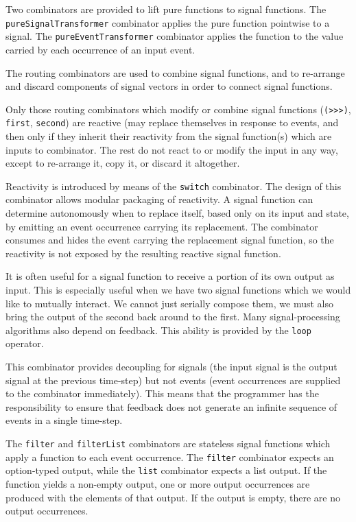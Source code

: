 Two combinators are provided to lift pure functions to signal functions.
The {\tt pureSignalTransformer} combinator applies the pure function pointwise
to a signal. The {\tt pureEventTransformer} combinator applies the function to
the value carried by each occurrence of an input event.

The routing combinators are used to combine signal functions, and to re-arrange
and discard components of signal vectors in order to connect signal functions.

Only those routing combinators which modify or combine signal functions
({\tt (>>>)}, {\tt first}, {\tt second}) are reactive (may replace themselves in
response to events, and then only if they inherit their reactivity from the
signal function(s) which are inputs to combinator. The rest do not
react to or modify the input in any way, except to re-arrange it, copy it, or
discard it altogether.

Reactivity is introduced by means of the {\tt switch} combinator.
The design of this combinator
allows modular packaging of reactivity. A signal function can determine
autonomously when to replace itself, based only on its input and state,
by emitting an event occurrence carrying its replacement. The combinator
consumes and hides the event carrying the replacement signal function, 
so the reactivity is not exposed by the resulting reactive signal function.

It is often useful for a signal function to receive a portion of its
own output as input. This is especially useful when we have two
signal functions which we would like to mutually interact. We cannot
just serially compose them, we must also bring the output of the second
back around to the first. Many signal-processing algorithms also depend
on feedback. This ability is provided by the {\tt loop} operator. 

This combinator provides decoupling for signals
(the input signal is the output signal at the previous time-step)
but not events (event occurrences are supplied to the combinator immediately).
This means that the programmer has the responsibility to ensure that feedback
does not generate an infinite sequence of events in a single time-step.

The {\tt filter} and {\tt filterList} combinators are stateless signal functions
which apply a function to each event occurrence. The {\tt filter} combinator
expects an option-typed output, while the {\tt list} combinator expects a list
output. If the function yields a non-empty output, one or more output occurrences
are produced with the elements of that output. If the output is empty, there
are no output occurrences.


